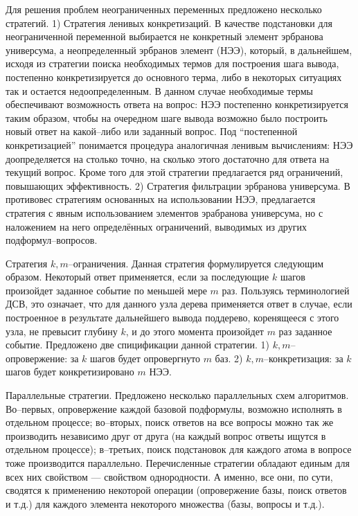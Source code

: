 \documentclass[a4paper]{report}
\begin{document}
Для решения проблем неограниченных переменных предложено несколько стратегий. 1) Стратегия ленивых конкретизаций. В качестве подстановки для неограниченной переменной выбирается не конкретный элемент эрбранова универсума, а неопределенный эрбранов элемент (НЭЭ), который, в дальнейшем, исходя из стратегии поиска необходимых термов для построения шага вывода, постепенно конкретизируется до основного терма, либо в некоторых ситуациях так и остается недоопределенным. В данном случае необходимые термы обеспечивают возможность ответа на вопрос: НЭЭ постепенно конкретизируется таким образом, чтобы на очередном шаге вывода возможно было построить новый ответ на какой--либо или заданный вопрос. Под ``постепенной конкретизацией'' понимается процедура аналогичная ленивым вычислениям: НЭЭ доопределяется на столько точно, на сколько этого достаточно для ответа на текущий вопрос. Кроме того для этой стратегии предлагается ряд ограничений, повышающих эффективность.  2) Стратегия фильтрации эрбранова универсума. В противовес стратегиям основанных на использовании НЭЭ, предлагается стратегия с явным использованием элементов эрабранова универсума, но с наложением на него определённых ограничений, выводимых из других подформул--вопросов.

Стратегия $k,m$--ограничения. Данная стратегия формулируется следующим образом. Некоторый ответ применяется, если за последующие $k$ шагов произойдет заданное событие по меньшей мере $m$ раз. Пользуясь терминологией ДСВ, это означает, что для данного узла дерева применяется ответ в случае, если построенное в результате дальнейшего вывода поддерево, коренящееся с этого узла, не превысит глубину $k$, и до этого момента произойдет $m$ раз заданное событие. Предложено две спицификации данной стратегии. 1) $k,m$--опровержение: за $k$ шагов будет опровергнуто $m$ баз. 2) $k,m$--конкретизация: за $k$ шагов будет конкретизировано $m$ НЭЭ.

Параллельные стратегии. Предложено несколько параллельных схем алгоритмов. Во--первых, опровержение каждой базовой подформулы, возможно исполнять в отдельном процессе; во--вторых, поиск ответов на все вопросы можно так же производить независимо друг от друга (на каждый вопрос ответы ищутся в отдельном процессе); в--третьих, поиск подстановок для каждого атома в вопросе тоже производится параллельно. Перечисленные стратегии обладают единым для всех них свойством --- свойством однородности. А именно, все они, по сути, сводятся к применению некоторой операции (опровержение базы, поиск ответов и т.д.) для каждого элемента некоторого множества (базы, вопросы и т.д.).
\end{document}
